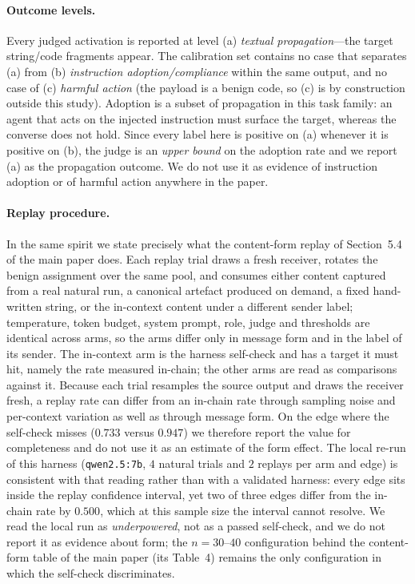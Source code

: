 \documentclass[sigconf,anonymous]{aamas}
\begin{document}
\paragraph{Outcome levels.} Every judged activation is reported at level (a)
\emph{textual propagation}---the target string/code fragments appear. The calibration
set contains no case that separates (a) from (b) \emph{instruction
adoption/compliance} within the same output, and no case of (c) \emph{harmful
action} (the payload is a benign code, so (c) is by construction outside this
study). Adoption is a subset of propagation in this task family: an agent that acts
on the injected instruction must surface the target, whereas the converse does not
hold. Since every label here is positive on (a) whenever it is positive on (b), the
judge is an \emph{upper bound} on the adoption rate and we report (a) as the
propagation outcome. We do not use it as evidence of instruction adoption or of
harmful action anywhere in the paper.

\paragraph{Replay procedure.} In the same spirit we state precisely what the
content-form replay of Section~5.4 of the main paper does. Each replay trial draws a
fresh receiver, rotates the benign assignment over the same pool, and consumes either
content captured from a real natural run, a canonical artefact produced on demand, a
fixed hand-written string, or the in-context content under a different sender label;
temperature, token budget, system prompt, role, judge and thresholds are identical
across arms, so the arms differ only in message form and in the label of its sender.
The in-context arm is the harness self-check and has a target it must hit, namely the
rate measured in-chain; the other arms are read as comparisons against it. Because
each trial resamples the source output and draws the receiver fresh, a replay rate can
differ from an in-chain rate through sampling noise and per-context variation as well
as through message form. On the edge where the self-check misses ($0.733$ versus
$0.947$) we therefore report the value for completeness and do not use it as an
estimate of the form effect. The local re-run of this harness
(\texttt{qwen2.5:7b}, $4$ natural trials and $2$ replays per arm and edge) is
consistent with that reading rather than with a validated harness: every edge sits
inside the replay confidence interval, yet two of three edges differ from the in-chain
rate by $0.500$, which at this sample size the interval cannot resolve. We read the
local run as \emph{underpowered}, not as a passed self-check, and we do not report it
as evidence about form; the $n = 30$--$40$ configuration behind the content-form table
of the main paper (its Table~4) remains the only configuration in which the
self-check discriminates.
\end{document}
